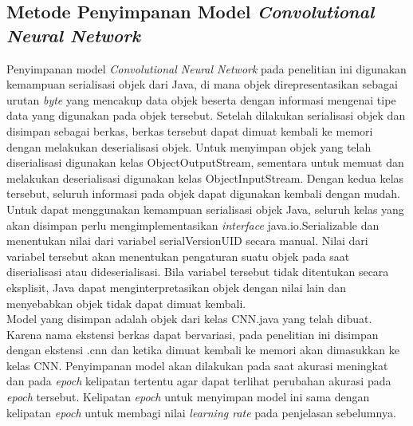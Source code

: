 \subsection{Metode Penyimpanan Model \textit{Convolutional Neural Network}}
\noindent Penyimpanan model \textit{Convolutional Neural Network} pada penelitian ini digunakan kemampuan serialisasi objek dari Java, di mana objek direpresentasikan sebagai urutan \textit{byte} yang mencakup data objek beserta dengan informasi mengenai tipe data yang digunakan pada objek tersebut. Setelah dilakukan serialisasi objek dan disimpan sebagai berkas, berkas tersebut dapat dimuat kembali ke memori dengan melakukan deserialisasi objek. Untuk menyimpan objek yang telah diserialisasi digunakan kelas ObjectOutputStream, sementara untuk memuat dan melakukan deserialisasi digunakan kelas ObjectInputStream. Dengan kedua kelas tersebut, seluruh informasi pada objek dapat digunakan kembali dengan mudah.\\
\noindent Untuk dapat menggunakan kemampuan serialisasi objek Java, seluruh kelas yang akan disimpan perlu mengimplementasikan \textit{interface} java.io.Serializable dan menentukan nilai dari variabel serialVersionUID secara manual. Nilai dari variabel tersebut akan menentukan pengaturan suatu objek pada saat diserialisasi atau dideserialisasi. Bila variabel tersebut tidak ditentukan secara eksplisit, Java dapat menginterpretasikan objek dengan nilai lain dan menyebabkan objek tidak dapat dimuat kembali.\\
\noindent Model yang disimpan adalah objek dari kelas CNN.java yang telah dibuat. Karena nama ekstensi berkas dapat bervariasi, pada penelitian ini disimpan dengan ekstensi .cnn dan ketika dimuat kembali ke memori akan dimasukkan ke kelas CNN. Penyimpanan model akan dilakukan pada saat akurasi meningkat dan pada \textit{epoch} kelipatan tertentu agar dapat terlihat perubahan akurasi pada  \textit{epoch} tersebut. Kelipatan \textit{epoch} untuk menyimpan model ini sama dengan kelipatan \textit{epoch} untuk membagi nilai \textit{learning rate} pada penjelasan sebelumnya.\\

